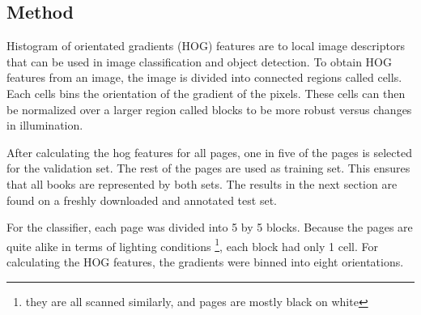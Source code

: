 \subsection{Method}
\label{subsec:pageclasmethod}
Histogram of orientated gradients (HOG) features are
to local image descriptors that can be used in image classification and object
detection\cite{dalal2005histograms}. To obtain HOG features from an image, the
image is divided into connected regions called cells. Each cells bins the
orientation of the gradient of the pixels. These cells can then be normalized
over a larger region called blocks to be more robust versus changes in
illumination.


After calculating the hog features for all pages, one in five of the pages is
selected for the validation set. The rest of the pages are used as training set.
This ensures that all books are represented by both sets. The results in the
next section are found on a freshly downloaded and annotated test set.


For the classifier, each page was divided into 5 by 5 blocks. Because the pages
are quite alike in terms of lighting conditions \footnote{they are all scanned
similarly, and pages are mostly black on white}, each block had only 1 cell. For
calculating the HOG features, the gradients were binned into eight orientations. 
